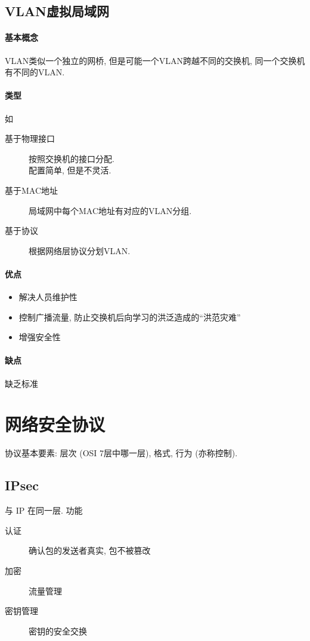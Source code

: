 \documentclass{ctexart}
\begin{document}
\subsection{VLAN虚拟局域网}
\paragraph{基本概念} VLAN类似一个独立的网桥, 但是可能一个VLAN跨越不同的交换机, 同一个交换机有不同的VLAN.
\paragraph{类型} 如 \begin{description} 
        \item[基于物理接口] 按照交换机的接口分配.\\ 配置简单, 但是不灵活.
        \item[基于MAC地址] 局域网中每个MAC地址有对应的VLAN分组.
        \item[基于协议] 根据网络层协议分划VLAN.
    \end{description}
\paragraph{优点} \begin{itemize}
        \item 解决人员维护性
        \item 控制广播流量, 防止交换机后向学习的洪泛造成的``洪范灾难''
        \item 增强安全性
    \end{itemize}
\paragraph{缺点} 缺乏标准

\section{网络安全协议}
    协议基本要素: 层次 (OSI 7层中哪一层), 格式, 行为 (亦称控制).
\subsection{IPsec}
    与 IP 在同一层. 功能 \begin{description}
        \item[认证] 确认包的发送者真实, 包不被篡改
        \item[加密] 流量管理
        \item[密钥管理] 密钥的安全交换
    \end{description}
\end{document}
